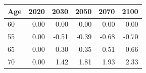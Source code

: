 \begin{tabular}{lrrrrr}
  \hline
Age & 2020 & 2030 & 2050 & 2070 & 2100 \\ 
  \hline
60 & 0.00 & 0.00 & 0.00 & 0.00 & 0.00 \\ 
  55 & 0.00 & -0.51 & -0.39 & -0.68 & -0.70 \\ 
  65 & 0.00 & 0.30 & 0.35 & 0.51 & 0.66 \\ 
  70 & 0.00 & 1.42 & 1.81 & 1.93 & 2.33 \\ 
   \hline
\end{tabular}
